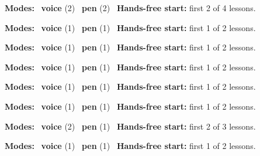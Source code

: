 \expandafter\def\csname hlchaptermodality13\endcsname{%
  {\small\noindent
    \textbf{Modes:} \hlvoicesign{}~\textbf{voice} (2) \quad \hlpensign{}~\textbf{pen} (2)\quad
    \hlvoicesign{}~\textbf{Hands-free start:} first 2 of 4 lessons.%
    \par}\medskip
}

\expandafter\def\csname hlchaptermodality14\endcsname{%
  {\small\noindent
    \textbf{Modes:} \hlvoicesign{}~\textbf{voice} (1) \quad \hlpensign{}~\textbf{pen} (1)\quad
    \hlvoicesign{}~\textbf{Hands-free start:} first 1 of 2 lessons.%
    \par}\medskip
}

\expandafter\def\csname hlchaptermodality15\endcsname{%
  {\small\noindent
    \textbf{Modes:} \hlvoicesign{}~\textbf{voice} (1) \quad \hlpensign{}~\textbf{pen} (1)\quad
    \hlvoicesign{}~\textbf{Hands-free start:} first 1 of 2 lessons.%
    \par}\medskip
}

\expandafter\def\csname hlchaptermodality16\endcsname{%
  {\small\noindent
    \textbf{Modes:} \hlvoicesign{}~\textbf{voice} (1) \quad \hlpensign{}~\textbf{pen} (1)\quad
    \hlvoicesign{}~\textbf{Hands-free start:} first 1 of 2 lessons.%
    \par}\medskip
}

\expandafter\def\csname hlchaptermodality17\endcsname{%
  {\small\noindent
    \textbf{Modes:} \hlvoicesign{}~\textbf{voice} (1) \quad \hlpensign{}~\textbf{pen} (1)\quad
    \hlvoicesign{}~\textbf{Hands-free start:} first 1 of 2 lessons.%
    \par}\medskip
}

\expandafter\def\csname hlchaptermodality18\endcsname{%
  {\small\noindent
    \textbf{Modes:} \hlvoicesign{}~\textbf{voice} (1) \quad \hlpensign{}~\textbf{pen} (1)\quad
    \hlvoicesign{}~\textbf{Hands-free start:} first 1 of 2 lessons.%
    \par}\medskip
}

\expandafter\def\csname hlchaptermodality19\endcsname{%
  {\small\noindent
    \textbf{Modes:} \hlvoicesign{}~\textbf{voice} (2) \quad \hlpensign{}~\textbf{pen} (1)\quad
    \hlvoicesign{}~\textbf{Hands-free start:} first 2 of 3 lessons.%
    \par}\medskip
}

\expandafter\def\csname hlchaptermodality20\endcsname{%
  {\small\noindent
    \textbf{Modes:} \hlvoicesign{}~\textbf{voice} (1) \quad \hlpensign{}~\textbf{pen} (1)\quad
    \hlvoicesign{}~\textbf{Hands-free start:} first 1 of 2 lessons.%
    \par}\medskip
}

